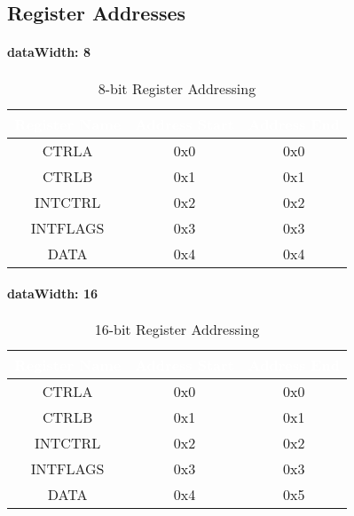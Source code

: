   \subsection{Register Addresses}
  
  \paragraph{dataWidth: 8}
  \begin{table}[H]
    \centering
    \begin{tabular}{|c|c|c|}
        \hline
        \rowcolor{darkgray}  %
        \textcolor{white}{\textbf{Register Name}} & \textcolor{white}{\textbf{Address Start}} & \textcolor{white}{\textbf{Address End}} \\ \hline
        CTRLA & 0x0 & 0x0 \\ \hline
        CTRLB & 0x1 & 0x1 \\ \hline
        INTCTRL & 0x2 & 0x2 \\ \hline
        INTFLAGS & 0x3 & 0x3 \\ \hline
        DATA & 0x4 & 0x4 \\ \hline
    \end{tabular}
    \caption{8-bit Register Addressing}
  \end{table}
  
  \paragraph{dataWidth: 16}
  \begin{table}[H]
    \centering
    \begin{tabular}{|c|c|c|}
      \hline
      \rowcolor{darkgray}  %
      \textcolor{white}{\textbf{Register Name}} & \textcolor{white}{\textbf{Address Start}} & \textcolor{white}{\textbf{Address End}} \\ \hline
      CTRLA & 0x0 & 0x0 \\ \hline
      CTRLB & 0x1 & 0x1 \\ \hline
      INTCTRL & 0x2 & 0x2 \\ \hline
      INTFLAGS & 0x3 & 0x3 \\ \hline
      DATA & 0x4 & 0x5 \\ \hline
    \end{tabular}
    \caption{16-bit Register Addressing}
  \end{table}
  

